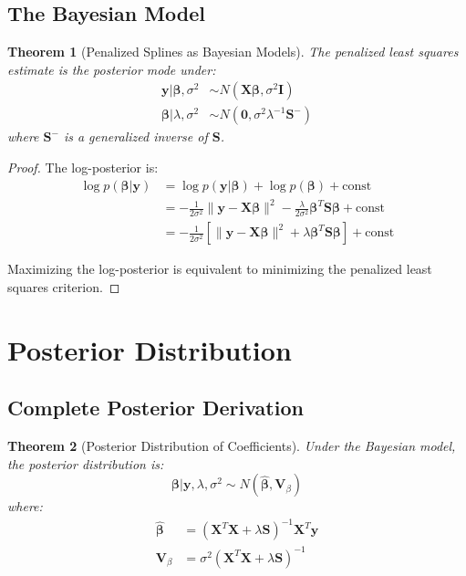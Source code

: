 \documentclass[12pt]{article}
\newtheorem{theorem}{Theorem}
\begin{document}
\subsection{The Bayesian Model}

\begin{theorem}[Penalized Splines as Bayesian Models]
The penalized least squares estimate is the posterior mode under:
\begin{align}
\mathbf{y} | \bm{\beta}, \sigma^2 &\sim N(\mathbf{X}\bm{\beta}, \sigma^2\mathbf{I}) \\
\bm{\beta} | \lambda, \sigma^2 &\sim N(\mathbf{0}, \sigma^2\lambda^{-1}\mathbf{S}^{-})
\end{align}
where $\mathbf{S}^{-}$ is a generalized inverse of $\mathbf{S}$.
\end{theorem}

\begin{proof}
The log-posterior is:
\begin{align}
\log p(\bm{\beta}|\mathbf{y}) &= \log p(\mathbf{y}|\bm{\beta}) + \log p(\bm{\beta}) + \text{const} \\
&= -\frac{1}{2\sigma^2}\|\mathbf{y} - \mathbf{X}\bm{\beta}\|^2 - \frac{\lambda}{2\sigma^2}\bm{\beta}^T\mathbf{S}\bm{\beta} + \text{const} \\
&= -\frac{1}{2\sigma^2}\left[\|\mathbf{y} - \mathbf{X}\bm{\beta}\|^2 + \lambda\bm{\beta}^T\mathbf{S}\bm{\beta}\right] + \text{const}
\end{align}

Maximizing the log-posterior is equivalent to minimizing the penalized least squares criterion.
\end{proof}

\section{Posterior Distribution}

\subsection{Complete Posterior Derivation}

\begin{theorem}[Posterior Distribution of Coefficients]
Under the Bayesian model, the posterior distribution is:
\begin{equation}
\bm{\beta} | \mathbf{y}, \lambda, \sigma^2 \sim N(\hat{\bm{\beta}}, \mathbf{V}_\beta)
\end{equation}
where:
\begin{align}
\hat{\bm{\beta}} &= (\mathbf{X}^T\mathbf{X} + \lambda\mathbf{S})^{-1}\mathbf{X}^T\mathbf{y} \\
\mathbf{V}_\beta &= \sigma^2(\mathbf{X}^T\mathbf{X} + \lambda\mathbf{S})^{-1}
\end{align}
\end{theorem}
\end{document}
